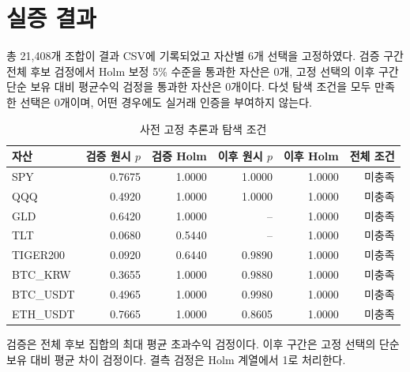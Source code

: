 \documentclass[11pt,a4paper]{article}
\begin{document}
\section{실증 결과}
총 21,408개 조합이 결과 CSV에 기록되었고 자산별 6개 선택을 고정하였다. 검증 구간 전체 후보 검정에서 Holm 보정 5\% 수준을 통과한 자산은 0개, 고정 선택의 이후 구간 단순 보유 대비 평균수익 검정을 통과한 자산은 0개이다. 다섯 탐색 조건을 모두 만족한 선택은 0개이며, 어떤 경우에도 실거래 인증을 부여하지 않는다.
\begin{table}[htbp]\centering
\footnotesize
\setlength{\tabcolsep}{4pt}
\caption{사전 고정 추론과 탐색 조건}
\begin{tabular}{lrrrrr}
\toprule
자산 & 검증 원시 $p$ & 검증 Holm & 이후 원시 $p$ & 이후 Holm & 전체 조건 \\
\midrule
SPY & 0.7675 & 1.0000 & 1.0000 & 1.0000 & 미충족 \\
QQQ & 0.4920 & 1.0000 & 1.0000 & 1.0000 & 미충족 \\
GLD & 0.6420 & 1.0000 & -- & 1.0000 & 미충족 \\
TLT & 0.0680 & 0.5440 & -- & 1.0000 & 미충족 \\
TIGER200 & 0.0920 & 0.6440 & 0.9890 & 1.0000 & 미충족 \\
BTC\_KRW & 0.3655 & 1.0000 & 0.9880 & 1.0000 & 미충족 \\
BTC\_USDT & 0.4965 & 1.0000 & 0.9980 & 1.0000 & 미충족 \\
ETH\_USDT & 0.7665 & 1.0000 & 0.8605 & 1.0000 & 미충족 \\
\bottomrule
\end{tabular}
\par\smallskip\begin{minipage}{\linewidth}\footnotesize 검증은 전체 후보 집합의 최대 평균 초과수익 검정이다. 이후 구간은 고정 선택의 단순 보유 대비 평균 차이 검정이다. 결측 검정은 Holm 계열에서 1로 처리한다.\end{minipage}
\end{table}
\end{document}
